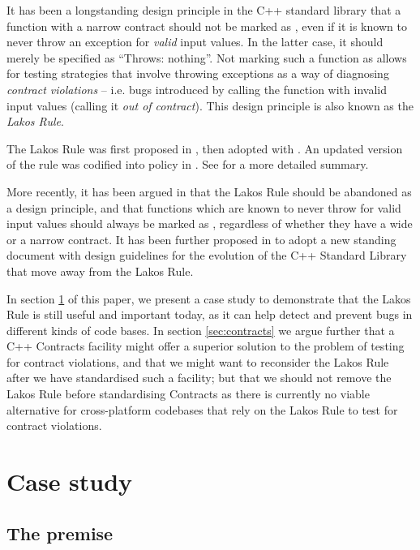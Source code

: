 It has been a longstanding design principle in the C++ standard library that a function with a narrow contract should not be marked as , even if it is known to never throw an exception for \emph{valid} input values. In the latter case, it should merely be specified as ``Throws: nothing''. Not marking such a function as  allows for testing strategies that involve throwing exceptions as a way of diagnosing \emph{contract violations} -- i.e. bugs introduced by calling the function with invalid input values (calling it \emph{out of contract}). This design principle is also known as the \emph{Lakos Rule}.

The Lakos Rule was first proposed in \cite{N3248}, then adopted with \cite{N3279}. An updated version of the rule was codified into policy in \cite{P0884R0}. See \cite{O'Dwyer2018} for a more detailed summary.

More recently, it has been argued in \cite{P1656R2} that the Lakos Rule should be abandoned as a design principle, and that functions which are known to never throw for valid input values should always be marked as , regardless of whether they have a wide or a narrow contract. It has been further proposed in \cite{P2148R0} to adopt a new standing document with design guidelines for the evolution of the C++
Standard Library that move away from the Lakos Rule.

In section \ref{sec:casestudy} of this paper, we present a case study to demonstrate that the Lakos Rule is still useful and important today, as it can help detect and prevent bugs in different kinds of code bases. In section \ref{sec:contracts} we argue further that a C++ Contracts facility might offer a superior solution to the problem of testing for contract violations, and that we might want to reconsider the Lakos Rule after we have standardised such a facility; but that we should not remove the Lakos Rule before standardising Contracts as there is currently no viable alternative for cross-platform codebases that rely on the Lakos Rule to test for contract violations.

\section{Case study}
\label{sec:casestudy}

\subsection{The premise}

